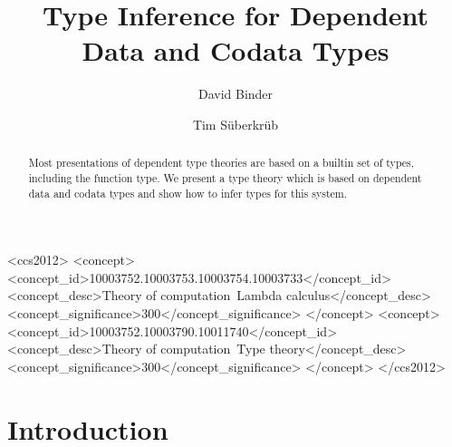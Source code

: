 \documentclass[acmsmall,review,anonymous,nonacm]{acmart}
\begin{document}
\title{Type Inference for Dependent Data and Codata Types}



\begin{CCSXML}
  <ccs2012>
  <concept>
  <concept_id>10003752.10003753.10003754.10003733</concept_id>
  <concept_desc>Theory of computation~Lambda calculus</concept_desc>
  <concept_significance>300</concept_significance>
  </concept>
  <concept>
  <concept_id>10003752.10003790.10011740</concept_id>
  <concept_desc>Theory of computation~Type theory</concept_desc>
  <concept_significance>300</concept_significance>
  </concept>
  </ccs2012>
\end{CCSXML}


\author{David Binder}


\author{Tim Süberkrüb}


\begin{abstract}
  Most presentations of dependent type theories are based on a builtin set of types, including the function type.
  We present a type theory which is based on dependent data and codata types and show how to infer types for this system.
\end{abstract}

\maketitle

\section{Introduction}
\label{sec:intro}

\end{document}
